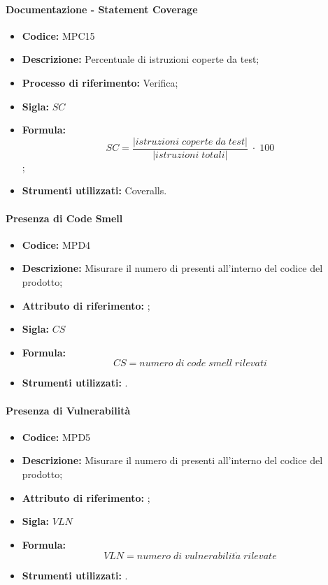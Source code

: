 \paragraph{Documentazione - Statement Coverage}
\begin{itemize}
    \item \textbf{Codice:} MPC15
    \item \textbf{Descrizione:} Percentuale di istruzioni coperte da test;
    \item \textbf{Processo di riferimento:} Verifica;
    \item \textbf{Sigla:} $SC$
    \item \textbf{Formula:} $$SC = \frac{|istruzioni \; coperte \; da \; test|}{|istruzioni \; totali|} \; \cdot \; 100$$;
    \item \textbf{Strumenti utilizzati:} Coveralls.
\end{itemize}

\paragraph{Presenza di Code Smell} 
\begin{itemize}
    \item \textbf{Codice:} MPD4
    \item \textbf{Descrizione:} Misurare il numero di  presenti all'interno del codice del prodotto;
    \item \textbf{Attributo di riferimento:} ;
    \item \textbf{Sigla:} $CS$
    \item \textbf{Formula:} $$CS = {numero \; di \; code \; smell \; rilevati}$$
    \item \textbf{Strumenti utilizzati:} .
\end{itemize}

\paragraph{Presenza di Vulnerabilità} 
\begin{itemize}
    \item \textbf{Codice:} MPD5
    \item \textbf{Descrizione:} Misurare il numero di  presenti all'interno del codice del prodotto;
    \item \textbf{Attributo di riferimento:} ;
    \item \textbf{Sigla:} $VLN$
    \item \textbf{Formula:} $$VLN = {numero \; di \; vulnerabilit\grave{a} \; rilevate}$$
    \item \textbf{Strumenti utilizzati:} .
\end{itemize}

